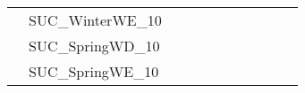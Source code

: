 \begin{table}[]
{\begin{tabular}{|c|l|ll|ll|ll|l|l|l|}
			& SUC\_WinterWE\_10             &                                   &                                  &                           &                          &                           &                          &                                       &                               & \\
			& SUC\_SpringWD\_10             &                                   &                                  &                           &                          &                           &                          &                                       &                               & \\
			& SUC\_SpringWE\_10             &                                   &                                  &                           &                          &                           &                          &                                       &                               & \\

\end{tabular}}
\end{table}
